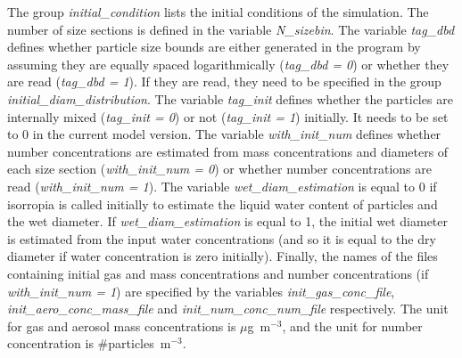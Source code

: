 \documentclass[a4paper,11pt]{article}
\begin{document}
The group {\textit{initial\_condition}} lists the initial conditions of the simulation. The number of size sections is defined in the variable {\textit{N\_sizebin}}. The variable {\textit{tag\_dbd}} defines whether particle size bounds are either generated in the program by assuming they are equally spaced logarithmically ({\textit{tag\_dbd = 0}}) or whether they are read ({\textit{tag\_dbd = 1}}). If they are read, they need to be specified in the group {\textit{initial\_diam\_distribution}}.
The variable {\textit{tag\_init}} defines whether the particles are internally mixed ({\textit{tag\_init = 0}}) or not ({\textit{tag\_init = 1}}) initially. It needs to be set to 0 in the current model version.
The variable {\textit{with\_init\_num}} defines whether number concentrations are estimated from mass concentrations and diameters of each size section ({\textit{with\_init\_num = 0}}) or whether number concentrations are read ({\textit{with\_init\_num = 1}}).
The variable {\textit{wet\_diam\_estimation}} is equal to 0 if isorropia is called
initially to estimate the liquid water content of particles and the wet
diameter. If {\textit{wet\_diam\_estimation}} is equal to 1, the initial wet diameter is
estimated from the input water concentrations (and so it is equal to the dry
diameter if water concentration is zero initially).
Finally, the names of the files containing initial gas and mass concentrations and number concentrations (if {\textit{with\_init\_num = 1}}) are specified by the variables {\textit{init\_gas\_conc\_file}}, {\textit{init\_aero\_conc\_mass\_file}} and {\textit{init\_num\_conc\_num\_file}} respectively.
The unit for gas and aerosol mass concentrations is $\mu$g~m$^{-3}$, and the unit for number concentration is \#particles~m$^{-3}$.
\end{document}
